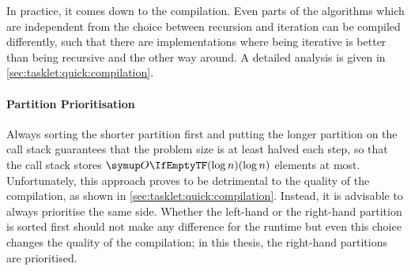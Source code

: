 In practice, it comes down to the compilation.
Even parts of the algorithms which are independent from the choice between recursion and iteration can be compiled differently, such that there are implementations where being iterative is better than being recursive and the other way around.
A detailed analysis is given in \cref{sec:tasklet:quick:compilation}.


\paragraph{Partition Prioritisation}
Always sorting the shorter partition first and putting the longer partition on the call stack guarantees that the problem size is at least halved each step, so that the call stack stores \(\bigoh{\log n}\) elements at most.
Unfortunately, this approach proves to be detrimental to the quality of the compilation, as shown in \cref{sec:tasklet:quick:compilation}.
Instead, it is advisable to always prioritise the same side.
Whether the left-hand or the right-hand partition is sorted first should not make any difference for the runtime but even this choice changes the quality of the compilation;
in this thesis, the right-hand partitions are prioritised.


